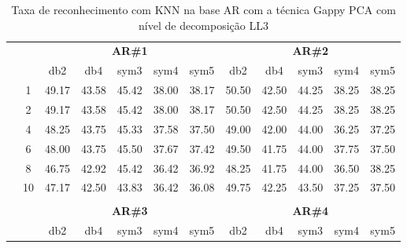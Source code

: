 \begin{table}[htpb]
	\centering
    \normalsize
	\caption{Taxa de reconhecimento com KNN na base AR com a técnica Gappy PCA com nível de decomposição LL3}
	\begin{tabular}{|c|c|c c c c c|c c c c c|}
\cline{3-12}
\multicolumn{2}{c|}{\multirow{2}{*}{}} & \multicolumn{5}{c|}{\textbf{AR\#1}}  & \multicolumn{5}{c|}{\textbf{AR\#2}} \\\cline{3-12}

\multicolumn{2}{c|}{}  & db2 & db4 & sym3 & sym4 & sym5 & db2 & db4& sym3 & sym4 & sym5 \\\hline

\multicolumn{1}{|c|}{ \multirow{5}{*}{\rotatebox[origin=c]{90}{\textbf{K-vizinhos}}} }
&1	&49.17	&43.58	&45.42	&38.00	&38.17	&50.50	&42.50	&44.25	&38.25	&38.25\\\cline{2-12}
&2	&49.17	&43.58	&45.42	&38.00	&38.17	&50.50	&42.50	&44.25	&38.25	&38.25\\\cline{2-12}
&4	&48.25	&43.75	&45.33	&37.58	&37.50	&49.00	&42.00	&44.00	&36.25	&37.25\\\cline{2-12}
&6	&48.00	&43.75	&45.50	&37.67	&37.42	&49.50	&41.75	&44.00	&37.75	&37.50\\\cline{2-12}
&8	&46.75	&42.92	&45.42	&36.42	&36.92	&48.25	&41.75	&44.00	&36.50	&38.25\\\cline{2-12}
&10	&47.17	&42.50	&43.83	&36.42	&36.08	&49.75	&42.25	&43.50	&37.25	&37.50\\ \midrule
\multicolumn{12}{c}{}\\ 




\cline{3-12}
\multicolumn{2}{c}{} & \multicolumn{5}{|c|}{\textbf{AR\#3}}  & \multicolumn{5}{c|}{\textbf{AR\#4}} \\\cline{3-12}
\multicolumn{2}{c}{}  & \multicolumn{1}{|c}{db2} & db4 & sym3 & sym4 & sym5 & db2 & db4& sym3 & sym4 & sym5 \\\hline


\end{tabular}
\end{table}

